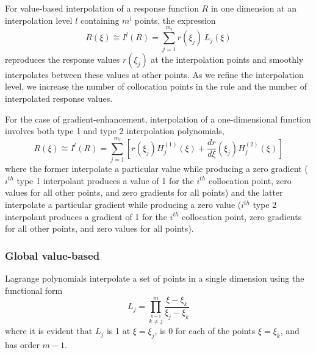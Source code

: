 For value-based interpolation of a response function $R$ in one
dimension at an interpolation level $l$ containing $m^l$ points, the
expression
\begin{equation}
R(\xi) \cong I^l(R) = \sum_{j=1}^{m_l} r(\xi_j)\,L_j(\xi) \label{eq:lagrange_interp_1d}
\end{equation}
reproduces the response values $r(\xi_j)$ at the interpolation points
and smoothly interpolates between these values at other points.  As we
refine the interpolation level, we increase the number of collocation 
points in the rule and the number of interpolated response values.

For the case of gradient-enhancement, interpolation of a 
one-dimensional function
involves both type 1 and type 2 interpolation polynomials,
\begin{equation}
R(\xi) \cong I^l(R) = \sum_{j=1}^{m_l} \left[ r(\xi_j) H_j^{(1)}(\xi) + 
  \frac{dr}{d\xi}(\xi_j) H_j^{(2)}(\xi) \right] \label{eq:hermite_interp_1d}
\end{equation}
where the former interpolate a particular value while producing a zero
gradient ($i^{th}$ type 1 interpolant produces a value of 1 for the
$i^{th}$ collocation point, zero values for all other points, and zero
gradients for all points) and the latter interpolate a particular
gradient while producing a zero value ($i^{th}$ type 2 interpolant
produces a gradient of 1 for the $i^{th}$ collocation point, zero
gradients for all other points, and zero values for all points).


\subsubsection{Global value-based} \label{uq:expansion:interp:Lagrange}

Lagrange polynomials interpolate a set of points in a single dimension
using the functional form
\begin{equation}
L_j = \prod_{\stackrel{\scriptstyle k=1}{k \ne j}}^m 
\frac{\xi - \xi_k}{\xi_j - \xi_k} \label{eq:lagrange_poly_1d}
\end{equation}
where it is evident that $L_j$ is 1 at $\xi = \xi_j$, is 0 for each of
the points $\xi = \xi_k$, and has order $m - 1$.  

